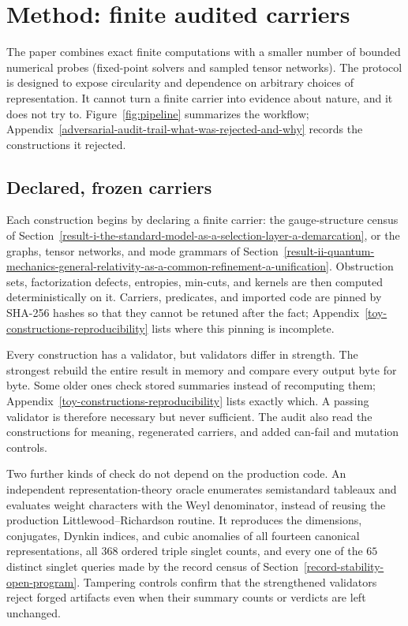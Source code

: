 \section{Method: finite audited carriers}\label{method-finite-audited-carriers-adversarial-self-correction}

The paper combines exact finite computations with a smaller number of bounded numerical probes (fixed-point solvers
and sampled tensor networks). The protocol is designed to expose circularity and dependence on arbitrary choices of
representation. It cannot turn a finite carrier into evidence about nature, and it does not try to.
Figure~\ref{fig:pipeline} summarizes the workflow; Appendix~\ref{adversarial-audit-trail-what-was-rejected-and-why}
records the constructions it rejected.



\subsection{Declared, frozen carriers}\label{finite-frozen-carriers}

Each construction begins by declaring a finite carrier: the gauge-structure census of
Section~\ref{result-i-the-standard-model-as-a-selection-layer-a-demarcation}, or the graphs, tensor networks, and
mode grammars of Section~\ref{result-ii-quantum-mechanics-general-relativity-as-a-common-refinement-a-unification}.
Obstruction sets, factorization defects, entropies, min-cuts, and kernels are then computed deterministically on it.
Carriers, predicates, and imported code are pinned by SHA-256 hashes so that they cannot be retuned after the fact;
Appendix~\ref{toy-constructions-reproducibility} lists where this pinning is incomplete.

Every construction has a validator, but validators differ in strength. The strongest rebuild the entire result in
memory and compare every output byte for byte. Some older ones check stored summaries instead of recomputing them;
Appendix~\ref{toy-constructions-reproducibility} lists exactly which. A passing validator is therefore necessary but
never sufficient. The audit also read the constructions for meaning, regenerated carriers, and added can-fail and
mutation controls.

Two further kinds of check do not depend on the production code. An independent representation-theory oracle
enumerates semistandard tableaux and evaluates weight characters with the Weyl denominator, instead of reusing the
production Littlewood--Richardson routine. It reproduces the dimensions, conjugates, Dynkin indices, and cubic anomalies
of all fourteen canonical representations, all \(368\) ordered triple singlet counts, and every one of the \(65\)
distinct singlet queries made by the record census of Section~\ref{record-stability-open-program}. Tampering controls
confirm that the strengthened validators reject forged artifacts even when their summary counts or verdicts are left
unchanged.

